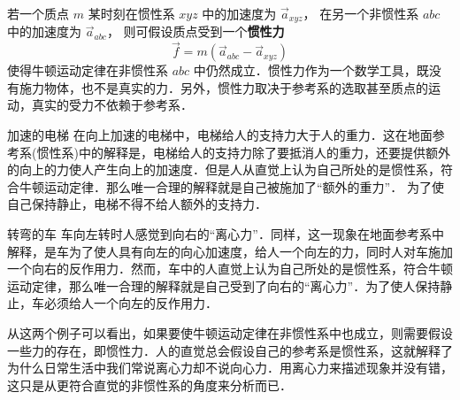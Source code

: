 

若一个质点 $m$ 某时刻在惯性系 $xyz$ 中的加速度为 $\vec a_{xyz}$， 在另一个非惯性系 $abc$ 中的加速度为 $\vec a_{abc}$， 则可假设质点受到一个\textbf{惯性力}
\begin{equation}
\vec f = m\left( {{{\vec a}_{abc}} - {{\vec a}_{xyz}}} \right)
\end{equation}
使得牛顿运动定律在非惯性系 $abc$ 中仍然成立．惯性力作为一个数学工具，既没有施力物体，也不是真实的力．另外，惯性力取决于参考系的选取甚至质点的运动，真实的受力不依赖于参考系．

\begin{exam}{加速的电梯}\label{Iner_ex1}
在向上加速的电梯中，电梯给人的支持力大于人的重力．这在地面参考系(惯性系)中的解释是，电梯给人的支持力除了要抵消人的重力，还要提供额外的向上的力使人产生向上的加速度．但是人从直觉上认为自己所处的是惯性系，符合牛顿运动定律．那么唯一合理的解释就是自己被施加了“额外的重力”． 为了使自己保持静止，电梯不得不给人额外的支持力．
\end{exam}

\begin{exam}{转弯的车}
车向左转时人感觉到向右的“离心力”．同样，这一现象在地面参考系中解释，是车为了使人具有向左的向心加速度，给人一个向左的力，同时人对车施加一个向右的反作用力．然而，车中的人直觉上认为自己所处的是惯性系，符合牛顿运动定律，那么唯一合理的解释就是自己受到了向右的“离心力”．为了使人保持静止，车必须给人一个向左的反作用力．
\end{exam}

从这两个例子可以看出，如果要使牛顿运动定律在非惯性系中也成立，则需要假设一些力的存在，即惯性力．人的直觉总会假设自己的参考系是惯性系，这就解释了为什么日常生活中我们常说离心力却不说向心力．用离心力来描述现象并没有错，这只是从更符合直觉的非惯性系的角度来分析而已．

